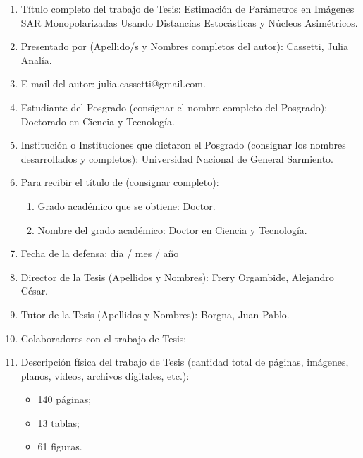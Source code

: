 \begin{enumerate}
	\item Título completo del trabajo de Tesis: Estimación de Parámetros en Imágenes SAR Monopolarizadas Usando Distancias Estocásticas y Núcleos Asimétricos.

	\item Presentado por (Apellido/s y Nombres completos del autor): Cassetti, Julia Analía.

	\item E-mail del autor: julia.cassetti@gmail.com.

	\item Estudiante del Posgrado (consignar el nombre completo del Posgrado): Doctorado en Ciencia y Tecnología.

	\item Institución o Instituciones que dictaron el Posgrado (consignar los nombres
desarrollados y completos): Universidad Nacional de General Sarmiento.

	\item Para recibir el título de (consignar completo):

	\begin{enumerate}%
	\item Grado académico que se obtiene: Doctor.
	\item Nombre del grado académico: Doctor en Ciencia y Tecnología.
	\end{enumerate}

	\item Fecha de la defensa: día / mes / año %

	\item Director de la Tesis (Apellidos y Nombres): Frery Orgambide, Alejandro César.

	\item Tutor de la Tesis (Apellidos y Nombres): Borgna, Juan Pablo.

	\item Colaboradores con el trabajo de Tesis: 

	\item Descripción física del trabajo de Tesis (cantidad total de páginas, imágenes, planos, videos, archivos digitales, etc.):
	\begin{itemize}%
		\item 140 páginas;
		\item 13 tablas;
		\item 61 figuras.
	\end{itemize}


\end{enumerate}
